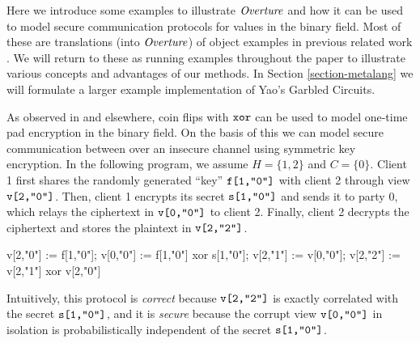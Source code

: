 Here we introduce some examples to illustrate $\mathit{Overture}$ and how it
can be used to model secure communication protocols for values in the
binary field. Most of these are translations (into $\mathit{Overture}$) of
object examples in previous related work
\cite{barthe2019probabilistic,darais2019language}.  We will return to
these as running examples throughout the paper to illustrate various
concepts and advantages of our methods. In Section
\ref{section-metalang} we will formulate a larger example
implementation of Yao's Garbled Circuits.
\begin{example}
  \label{example-otp}
As observed in \cite{barthe2019probabilistic} and elsewhere, coin flips with $\texttt{xor}$ can
be used to model one-time pad encryption in the binary field. On the
basis of this we can model secure communication between over an
insecure channel using symmetric key encryption. In the following
program, we assume $H = \{ 1,2 \}$ and $C = \{ 0 \}$. Client 1 first
shares the randomly generated ``key'' $\texttt{f[1,"0"]}$ with client 2
through view $\texttt{v[2,"0"]}$. Then, client 1 encrypts its secret
$\texttt{s[1,"0"]}$ and sends it to party 0, which relays the ciphertext in
$\texttt{v[0,"0"]}$ to client 2. Finally, client 2 decrypts the ciphertext
and stores the plaintext in $\texttt{v[2,"2"]}$.
{\small
  \begin{verbatimtab}
    v[2,"0"] := f[1,"0"];
    v[0,"0"] := f[1,"0"] xor s[1,"0"];
    v[2,"1"] := v[0,"0"];
    v[2,"2"] := v[2,"1"] xor v[2,"0"]  \end{verbatimtab}
}
Intuitively, this protocol is \emph{correct} because $\texttt{v[2,"2"]}$ is
exactly correlated with the secret $\texttt{s[1,"0"]}$, and it is
\emph{secure} because the corrupt view $\texttt{v[0,"0"]}$ in isolation is
probabilistically independent of the secret $\texttt{s[1,"0"]}$.
\end{example}

